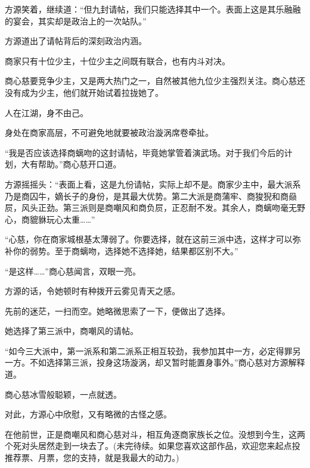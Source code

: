 \begin{this_body}
方源笑着，继续道：“但九封请帖，我们只能选择其中一个。表面上这是其乐融融的宴会，其实却是政治上的一次站队。”

方源道出了请帖背后的深刻政治内涵。

商家只有十位少主，十位少主之间既有联合，也有内斗对决。

商心慈要竞争少主，又是两大热门之一，自然被其他九位少主强烈关注。商心慈还没有成为少主，他们就开始试着拉拢她了。

人在江湖，身不由己。

身处在商家高层，不可避免地就要被政治漩涡席卷牵扯。

“我是否应该选择商螭吻的这封请帖，毕竟她掌管着演武场。对于我们今后的计划，大有帮助。”商心慈开口道。

方源摇摇头：“表面上看，这是九份请帖，实际上却不是。商家少主中，最大派系乃是商囚牛，嫡长子的身份，是其最大优势。第二大派是商蒲牢、商狻猊和商赑屃，风头正劲。第三派则是商嘲风和商负屃，正忍耐不发。其余人，商螭吻毫无野心，商貔貅玩心太重……”

“心慈，你在商家城根基太薄弱了。你要选择，就在这前三派中选，这样才可以弥补你的弱势。至于商螭吻，选择她不选择她，结果都区别不大。”

“是这样……”商心慈闻言，双眼一亮。

方源的话，令她顿时有种拨开云雾见青天之感。

先前的迷茫，一扫而空。她略微思索了一下，便做出了选择。

她选择了第三派中，商嘲风的请帖。

“如今三大派中，第一派系和第二派系正相互较劲，我参加其中一方，必定得罪另一方。不如选择第三派，投身这场漩涡，却又暂时能置身事外。”商心慈对方源解释道。

商心慈冰雪般聪颖，一点就透。

对此，方源心中欣慰，又有略微的古怪之感。

在他前世，正是商嘲风和商心慈对斗，相互角逐商家族长之位。没想到今生，这两个死对头居然走到一块去了。(未完待续。如果您喜欢这部作品，欢迎您来起点投推荐票、月票，您的支持，就是我最大的动力。)

\end{this_body}

